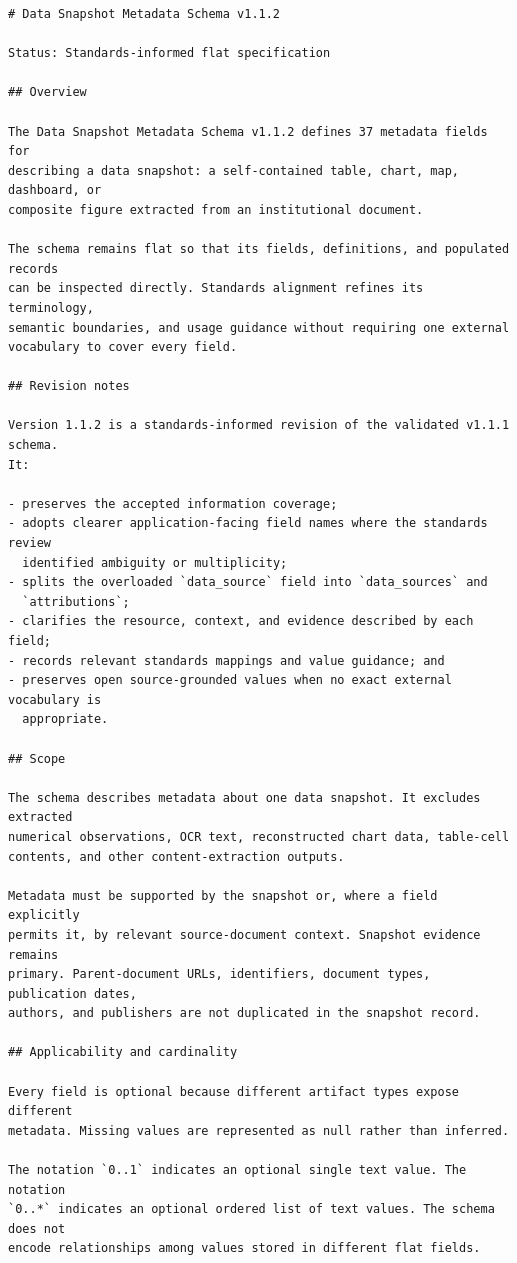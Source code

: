 \documentclass{article}
\begin{document}
\begin{lstlisting}
# Data Snapshot Metadata Schema v1.1.2

Status: Standards-informed flat specification

## Overview

The Data Snapshot Metadata Schema v1.1.2 defines 37 metadata fields for
describing a data snapshot: a self-contained table, chart, map, dashboard, or
composite figure extracted from an institutional document.

The schema remains flat so that its fields, definitions, and populated records
can be inspected directly. Standards alignment refines its terminology,
semantic boundaries, and usage guidance without requiring one external
vocabulary to cover every field.

## Revision notes

Version 1.1.2 is a standards-informed revision of the validated v1.1.1 schema.
It:

- preserves the accepted information coverage;
- adopts clearer application-facing field names where the standards review
  identified ambiguity or multiplicity;
- splits the overloaded `data_source` field into `data_sources` and
  `attributions`;
- clarifies the resource, context, and evidence described by each field;
- records relevant standards mappings and value guidance; and
- preserves open source-grounded values when no exact external vocabulary is
  appropriate.

## Scope

The schema describes metadata about one data snapshot. It excludes extracted
numerical observations, OCR text, reconstructed chart data, table-cell
contents, and other content-extraction outputs.

Metadata must be supported by the snapshot or, where a field explicitly
permits it, by relevant source-document context. Snapshot evidence remains
primary. Parent-document URLs, identifiers, document types, publication dates,
authors, and publishers are not duplicated in the snapshot record.

## Applicability and cardinality

Every field is optional because different artifact types expose different
metadata. Missing values are represented as null rather than inferred.

The notation `0..1` indicates an optional single text value. The notation
`0..*` indicates an optional ordered list of text values. The schema does not
encode relationships among values stored in different flat fields.


\end{lstlisting}
\end{document}
